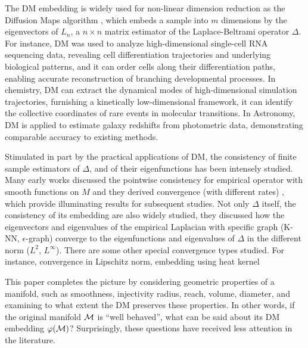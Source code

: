 The DM embedding is widely used for non-linear dimension reduction as the Diffusion Maps algorithm \cite{COIFMAN20065,lafon2006diffusion,coifman2008diffusion,arvizu2016dimensionality}, which embeds a sample into $m$ dimensions by the eigenvectors of $L_n$, a $n\times n$ matrix estimator of the Laplace-Beltrami operator $\Delta$.
For instance, DM was used to analyze high-dimensional single-cell RNA sequencing data, revealing cell differentiation trajectories and underlying biological patterns\cite{haghverdi2015diffusion}, and it can order cells along their differentiation paths, enabling accurate reconstruction of branching developmental processes\cite{haghverdi2016diffusion}. 
In chemistry, DM can extract the dynamical modes of high-dimensional simulation trajectories, furnishing a kinetically low-dimensional framework\cite{ferguson2011nonlinear}, it can identify the collective coordinates of rare events in molecular transitions\cite{boninsegna2015investigating}.
In Astronomy, DM is applied to estimate galaxy redshifts from photometric data, demonstrating comparable accuracy to existing methods\cite{freeman2009photometric}.

Stimulated in part by the practical applications of DM, the consistency of  finite sample estimators of $\Delta$, and of their eigenfunctions has been intensely studied. Many early works discussed the pointwise consistency for empirical operator with smooth functions on $M$ and they derived convergence (with different rates) \cite{von2008consistency,belkin2008towards,gine2006empirical,10.5555/3104322.3104459,hein2007graph}, which provide illuminating results for subsequent studies. Not only $\Delta$ itself, the consistency of its embedding are also widely studied, they discussed how the eigenvectors and eigenvalues of the empirical Laplacian with specific graph (K-NN, $\epsilon$-graph) converge to the eigenfunctions and eigenvalues of $\Delta$ in the different norm ($L^2$, $L^\infty$)\cite{cheng2022eigen,garcia2020error,wang2015spectral,belkin2006convergence}. There are some other special convergence types studied. For instance, convergence in Lipschitz norm\cite{calder2022lipschitz}, embedding using heat kernel\cite{jones2008manifold,DUNSON2021282}

This paper completes the picture by considering geometric properties of a manifold, such as smoothness, injectivity radius, reach, volume, diameter, and examining to what extent the DM preserves these properties. In other words, if the original manifold $\mathcal{M}$ is ``well behaved'', what can be said about its DM embedding $\varphi(\mathcal{M})$? Surprisingly, these questions have received less attention in the literature.

